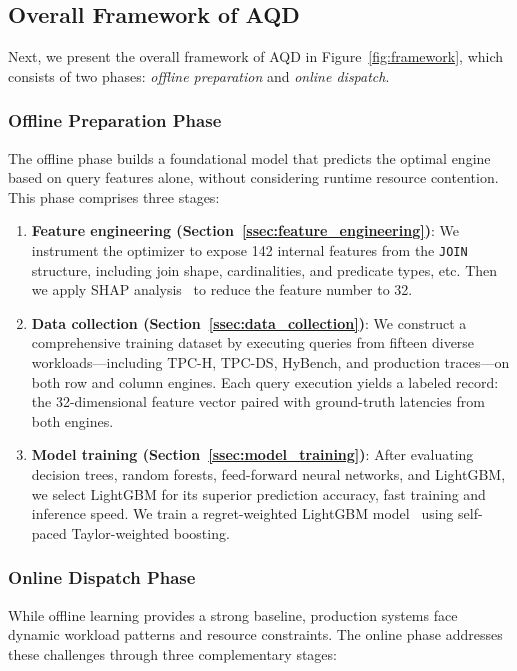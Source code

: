 \documentclass[sigconf, nonacm]{acmart}
\newcommand{\dispatcher}{AQD\xspace}
\begin{document}
\subsection{Overall Framework of \dispatcher}
Next, we present the overall framework of \dispatcher in Figure~\ref{fig:framework}, which consists of two phases: \emph{offline preparation} and \emph{online dispatch}.


\subsubsection{Offline Preparation Phase}
The offline phase builds a foundational model that predicts the optimal engine based on query features alone, without considering runtime resource contention. This phase comprises three stages:

\begin{enumerate}[leftmargin=*]
  \item \textbf{Feature engineering (Section~\ref{ssec:feature_engineering})}:
        We instrument the optimizer to expose 142 internal features from the \texttt{JOIN} structure, including join shape, cardinalities, and predicate types, etc.
        Then we apply SHAP analysis~\cite{lundberg2017unified,lundberg2019explainable} to reduce the feature number to 32.
  
  \item \textbf{Data collection (Section~\ref{ssec:data_collection})}:
        We construct a comprehensive training dataset by executing queries from fifteen diverse workloads—including TPC-H, TPC-DS, HyBench, and production traces—on both row and column engines. Each query execution yields a labeled record: the 32-dimensional feature vector paired with ground-truth latencies from both engines.
  
  
  \item \textbf{Model training (Section~\ref{ssec:model_training})}:
        After evaluating decision trees, random forests, feed-forward neural networks, and LightGBM, we select LightGBM for its superior prediction accuracy, fast training and inference speed. We train a regret-weighted LightGBM model~\cite{ke2017lightgbm} using self-paced Taylor-weighted boosting.
\end{enumerate}


\subsubsection{Online Dispatch Phase}
While offline learning provides a strong baseline, production systems face dynamic workload patterns and resource constraints. The online phase addresses these challenges through three complementary stages:
\end{document}
